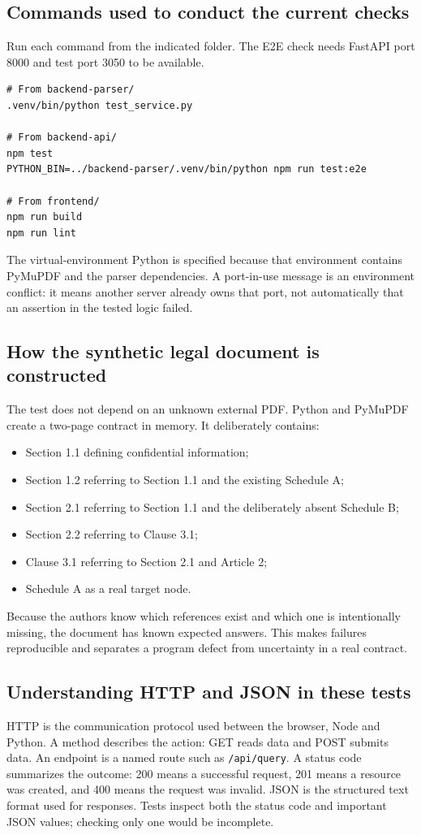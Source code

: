 \documentclass[11pt,letterpaper]{article}
\begin{document}
\subsection{Commands used to conduct the current checks}
Run each command from the indicated folder. The E2E check needs FastAPI port 8000 and test port 3050 to be available.
\begin{lstlisting}
# From backend-parser/
.venv/bin/python test_service.py

# From backend-api/
npm test
PYTHON_BIN=../backend-parser/.venv/bin/python npm run test:e2e

# From frontend/
npm run build
npm run lint
\end{lstlisting}
The virtual-environment Python is specified because that environment contains PyMuPDF and the parser dependencies. A port-in-use message is an environment conflict: it means another server already owns that port, not automatically that an assertion in the tested logic failed.

\subsection{How the synthetic legal document is constructed}
The test does not depend on an unknown external PDF. Python and PyMuPDF create a two-page contract in memory. It deliberately contains:
\begin{itemize}
  \item Section 1.1 defining confidential information;
  \item Section 1.2 referring to Section 1.1 and the existing Schedule A;
  \item Section 2.1 referring to Section 1.1 and the deliberately absent Schedule B;
  \item Section 2.2 referring to Clause 3.1;
  \item Clause 3.1 referring to Section 2.1 and Article 2;
  \item Schedule A as a real target node.
\end{itemize}
Because the authors know which references exist and which one is intentionally missing, the document has known expected answers. This makes failures reproducible and separates a program defect from uncertainty in a real contract.

\subsection{Understanding HTTP and JSON in these tests}
HTTP is the communication protocol used between the browser, Node and Python. A method describes the action: GET reads data and POST submits data. An endpoint is a named route such as \texttt{/api/query}. A status code summarizes the outcome: 200 means a successful request, 201 means a resource was created, and 400 means the request was invalid. JSON is the structured text format used for responses. Tests inspect both the status code and important JSON values; checking only one would be incomplete.
\end{document}
